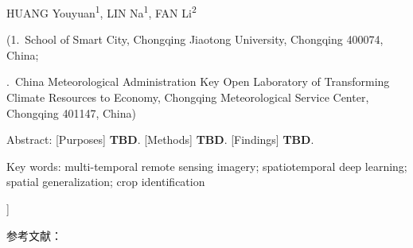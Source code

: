 \documentclass[a4paper, zihao=5, twocolumn]{ctexart}
\begin{document}
\begin{@twocolumnfalse}
\vspace{0.5em}

{\centering \rmfamily {} HUANG Youyuan\textsuperscript{1}, LIN Na\textsuperscript{1}, FAN Li\textsuperscript{2}\par}

\vspace{0.3em}

{\rmfamily {}
(1.~School of Smart City, Chongqing Jiaotong University, Chongqing 400074, China;\par
{}.~China Meteorological Administration Key Open Laboratory of Transforming Climate Resources to Economy, Chongqing Meteorological Service Center, Chongqing 401147, China)\par}

\vspace{0.5em}

{\rmfamily {}
\noindent Abstract: [Purposes] \textbf{TBD}. [Methods] \textbf{TBD}. [Findings] \textbf{TBD}.\par}

\vspace{0.3em}

{\rmfamily {}
\noindent Key words: multi-temporal remote sensing imagery; spatiotemporal deep learning; spatial generalization; crop identification\par}

\vspace{1em}
\endgroup
\end{@twocolumnfalse}
]








\vspace{1em}
{\noindent \heiti {} 参考文献：\par}
\vspace{0.3em}
{


}
\end{document}

